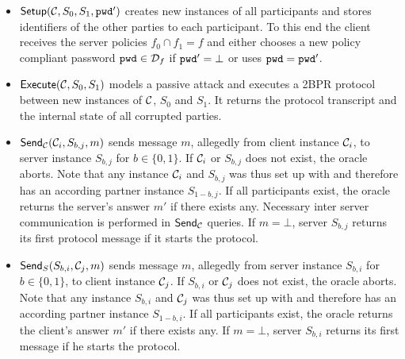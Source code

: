 \begin{itemize}
  \item $\mathsf{Setup}(\mathcal{C},S_0,S_1, \mathtt{pwd}')$ creates new instances of all participants and stores identifiers of the other parties to each participant.
        To this end the client receives the server policies $f_0\cap f_1=f$ and either chooses a new policy compliant password $\mathtt{pwd}\in\mathcal{D}_f$ if $\mathtt{pwd}'=\bot$ or uses $\mathtt{pwd}=\mathtt{pwd}'$.

  \item $\mathsf{Execute}(\mathcal{C},S_0,S_1)$ models a passive attack and executes a 2BPR protocol between new instances of $\mathcal{C}$, $S_0$ and $S_1$. %
        It returns the protocol transcript and the internal state of all corrupted parties.

  \item $\mathsf{Send}_\mathcal{C}(\mathcal{C}_i,S_{b,j},m)$ sends message $m$, allegedly from client instance $\mathcal{C}_i$, to server instance $S_{b,j}$ for $b\in\{0,1\}$.
        If $\mathcal{C}_i$ or $S_{b,j}$ does not exist, the oracle aborts. %
        Note that any instance $\mathcal{C}_i$ and $S_{b,j}$ was thus set up with \Setup and therefore has an according partner instance $S_{1-b,j}$.
        If all participants exist, the oracle returns the server's answer $m'$ if there exists any.
        Necessary inter server communication is performed in $\mathsf{Send}_\mathcal{C}$ queries.
        If $m=\bot$, server $S_{b,j}$ returns its first protocol message if it starts the protocol.

  \item $\mathsf{Send}_S(S_{b,i},\mathcal{C}_{j},m)$ sends message $m$, allegedly from server instance $S_{b,i}$ for $b\in\{0,1\}$, to client instance $\mathcal{C}_{j}$.
        If $S_{b,i}$ or $\mathcal{C}_j$ does not exist, the oracle aborts.
        Note that any instance $S_{b,i}$ and $\mathcal{C}_j$ was thus set up with \Setup and therefore has an according partner instance $S_{1-b,i}$.
        If all participants exist, the oracle returns the client's answer $m'$ if there exists any.
        If $m=\bot$, server $S_{b,i}$ returns its first message if he starts the protocol.


\end{itemize}
